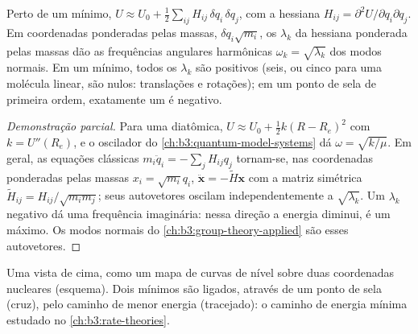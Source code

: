 \begin{proposition}\label{prop:b3:computational-chemistry:hessian}
Perto de um mínimo, $U \approx U_0 + \frac12\sum_{ij}H_{ij}\,\delta q_i\,\delta q_j$, com
a hessiana $H_{ij} = \partial^2U/\partial q_i\partial q_j$. Em coordenadas
ponderadas pelas massas, $\delta q_i\sqrt{m_i}$, os  $\lambda_k$ da
hessiana ponderada pelas massas dão as frequências angulares harmônicas $\omega_k =
\sqrt{\lambda_k}$ dos modos normais. Em um mínimo, todos os $\lambda_k$ são
positivos (seis, ou cinco para uma molécula linear, são nulos: translações e
rotações); em um ponto de sela de primeira ordem, exatamente um é negativo.
\end{proposition}

\begin{proof}[Demonstração parcial]
Para uma diatômica, $U \approx U_0 + \frac12k(R - R_e)^2$ com $k = U''(R_e)$, e
o oscilador do \cref{ch:b3:quantum-model-systems} dá $\omega =
\sqrt{k/\mu}$. Em geral, as equações clássicas $m_i\ddot q_i =
-\sum_jH_{ij}q_j$ tornam-se, nas coordenadas ponderadas pelas massas $x_i = \sqrt{m_i}q_i$,
$\ddot{\mathbf x} = -\tilde H\mathbf x$ com a matriz simétrica $\tilde H_{ij} =
H_{ij}/\sqrt{m_im_j}$; seus autovetores oscilam independentemente a
$\sqrt{\lambda_k}$. Um $\lambda_k$ negativo dá uma frequência imaginária: nessa
direção a energia diminui, é um máximo. Os modos normais do
\cref{ch:b3:group-theory-applied} são esses autovetores.
\end{proof}

\begin{omfigure}

{\small Uma  vista de cima, como um mapa de
curvas de nível sobre duas coordenadas nucleares (esquema). Dois mínimos são
ligados, através de um ponto de sela (cruz), pelo caminho de menor energia
(tracejado): o caminho de energia mínima estudado no \cref{ch:b3:rate-theories}.}
\end{omfigure}

